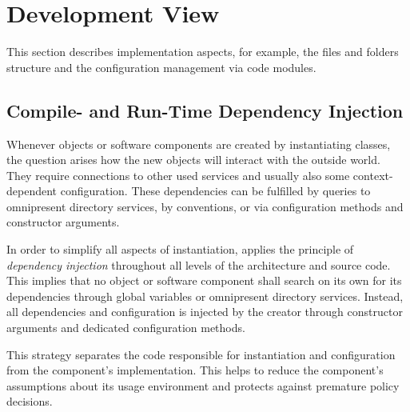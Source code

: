 
\section{Development View}
\label{sec:global-development-view}

This section describes implementation aspects, for example, the files and folders structure and the configuration management via code modules.

\subsection{Compile- and Run-Time Dependency Injection}
\label{sec:dependency-injection-impl}

Whenever objects or software components are created by instantiating classes, the question arises how the new objects will interact with the outside world. They require connections to other used services and usually also some context-dependent configuration. These dependencies can be fulfilled by queries to omnipresent directory services, by conventions, or via configuration methods and constructor arguments. 

In order to simplify all aspects of instantiation, \mythos applies the principle of \emph{dependency injection} throughout all levels of the architecture and source code. This implies that no object or software component shall search on its own for its dependencies through global variables or omnipresent directory services. Instead, all dependencies and configuration is injected by the creator through constructor arguments and dedicated configuration methods.

This strategy separates the code responsible for instantiation and configuration from the
component's implementation. This helps to reduce the component's assumptions about its usage environment and protects against premature policy decisions.

